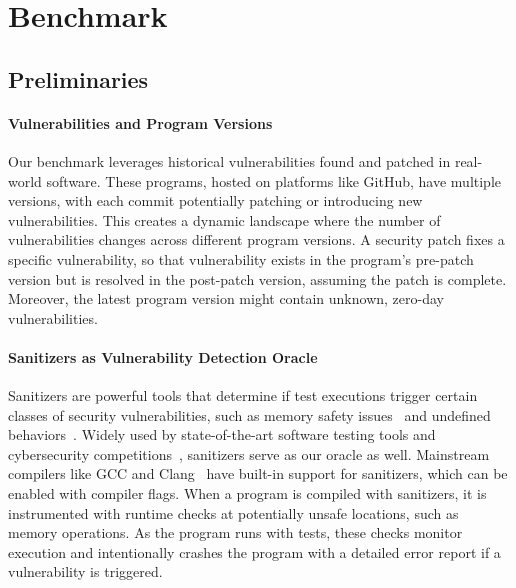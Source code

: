 \section{\sysname Benchmark}
\label{sec:dataset}

\subsection{Preliminaries}

\paragraph{Vulnerabilities and Program Versions}
Our \sysname benchmark leverages historical vulnerabilities found and patched in real-world software.
These programs, hosted on platforms like GitHub, have multiple versions, with each commit potentially patching or introducing new vulnerabilities.
This creates a dynamic landscape where the number of vulnerabilities changes across different program versions.
A security patch fixes a specific vulnerability, so that vulnerability exists in the program's pre-patch version but is resolved in the post-patch version, assuming the patch is complete.
Moreover, the latest program version might contain unknown, zero-day vulnerabilities.

\paragraph{Sanitizers as Vulnerability Detection Oracle}
Sanitizers are powerful tools that determine if test executions trigger certain classes of security vulnerabilities, such as memory safety issues~\citep{serebryany2012addresssanitizer,stepanov2015memorysanitizer} and undefined behaviors~\citep{ubsan}.
Widely used by state-of-the-art software testing tools and cybersecurity competitions~\citep{afl,ossfuzz,aixcc}, sanitizers serve as our oracle as well.
Mainstream compilers like GCC and Clang~\citep{gcc,clang} have built-in support for sanitizers, which can be enabled with compiler flags.
When a program is compiled with sanitizers, it is instrumented with runtime checks at potentially unsafe locations, such as memory operations.
As the program runs with tests, these checks monitor execution and intentionally crashes the program with a detailed error report if a vulnerability is triggered.


